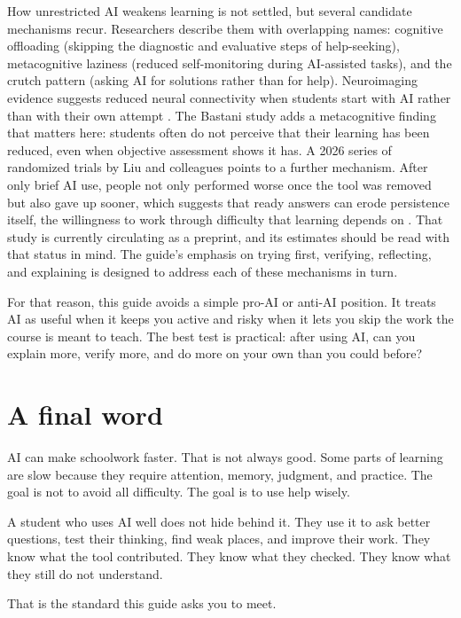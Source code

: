\documentclass{SIAMbook2023}
\begin{document}
How unrestricted AI weakens learning is not settled, but several candidate mechanisms recur. Researchers describe them with overlapping names: cognitive offloading (skipping the diagnostic and evaluative steps of help-seeking), metacognitive laziness (reduced self-monitoring during AI-assisted tasks), and the crutch pattern (asking AI for solutions rather than for help). Neuroimaging evidence suggests reduced neural connectivity when students start with AI rather than with their own attempt \citep{kosmyna2025brain}. The Bastani study adds a metacognitive finding that matters here: students often do not perceive that their learning has been reduced, even when objective assessment shows it has. A 2026 series of randomized trials by Liu and colleagues points to a further mechanism. After only brief AI use, people not only performed worse once the tool was removed but also gave up sooner, which suggests that ready answers can erode persistence itself, the willingness to work through difficulty that learning depends on \citep{liu2026ai}. That study is currently circulating as a preprint, and its estimates should be read with that status in mind. The guide's emphasis on trying first, verifying, reflecting, and explaining is designed to address each of these mechanisms in turn.

For that reason, this guide avoids a simple pro-AI or anti-AI position. It treats AI as useful when it keeps you active and risky when it lets you skip the work the course is meant to teach. The best test is practical: after using AI, can you explain more, verify more, and do more on your own than you could before?

\section{A final word}
\label{sec:final-word}%

AI can make schoolwork faster. That is not always good. Some parts of learning are slow because they require attention, memory, judgment, and practice. The goal is not to avoid all difficulty. The goal is to use help wisely.

A student who uses AI well does not hide behind it. They use it to ask better questions, test their thinking, find weak places, and improve their work. They know what the tool contributed. They know what they checked. They know what they still do not understand.

That is the standard this guide asks you to meet.
\end{document}
